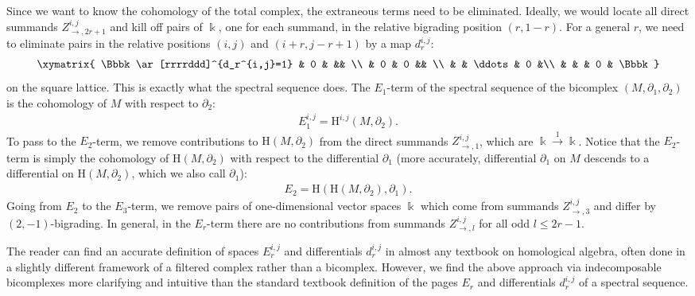 \documentclass[pdftex]{sigma}
\theoremstyle{definition}
\numberwithin{equation}{section}
\def\dif{\partial}
\newcommand{\mH}{\mathrm{H}} %
\begin{document}
Since we want to know the cohomology of the total complex,
the extraneous terms need to be eliminated. Ideally, we would
locate all direct summands $Z^{i,j}_{\rightarrow,2r+1}$
and kill off pairs of $\Bbbk$, one for each summand, in the relative
bigrading position $(r,1-r)$. For a general $r$, we need to
eliminate pairs in the relative positions $(i,j)$ and $(i+r,j-r+1)$ by a map $d_r^{i,j}$:
\[
\begin{gathered}
\xymatrix{
 \Bbbk \ar[rrrrddd]^{d_r^{i,j}=1} & 0 & && \\
 & 0 & 0 && \\
 & & \ddots & 0 &\\
 & & & 0 & \Bbbk
}
\end{gathered}
\]
on the square lattice. This is exactly what the spectral sequence does.
The $E_1$-term of the spectral sequence of the bicomplex $(M,\dif_1,\dif_2)$
is the cohomology of $M$ with respect to $\dif_2$:
\begin{gather*}E_1^{i,j} = \mH^{i,j}(M,\dif_2).\end{gather*}
To pass to the $E_2$-term, we remove contributions to $\mH(M,\dif_2)$ from the
direct summands $Z^{i,j}_{\rightarrow, 1}$, which are
$\Bbbk\stackrel{1}{\rightarrow} \Bbbk$.
Notice that the $E_2$-term is simply the cohomology of $\mH(M,\dif_2)$ with
respect to the differential $\dif_1$ (more accurately, differential $\dif_1$ on $M$
descends to a differential on $\mH(M,\dif_2)$, which we also call $\dif_1$):
\begin{gather*} E_2 = \mH(\mH(M,\dif_2), \dif_1).\end{gather*}
Going from $E_2$ to the $E_3$-term, we remove pairs of one-dimensional vector
spaces $\Bbbk$
which come from summands $Z^{i,j}_{\rightarrow, 3}$ and differ by $(2,-1)$-bigrading.
In general, in the $E_r$-term there are no contributions from
summands $Z^{i,j}_{\rightarrow, l}$ for all odd $l\leq 2r-1$.

The reader can find an accurate definition of spaces $E_r^{i,j}$
and differentials $d_r^{i,j}$ in almost any textbook on homological algebra,
often done in a slightly different framework of a filtered complex rather than
a bicomplex. However, we find the above approach via indecomposable
bicomplexes more clarifying and intuitive than the standard textbook definition of the pages
$E_r$ and differentials $d_r^{i,j}$ of a spectral sequence.
\end{document}

